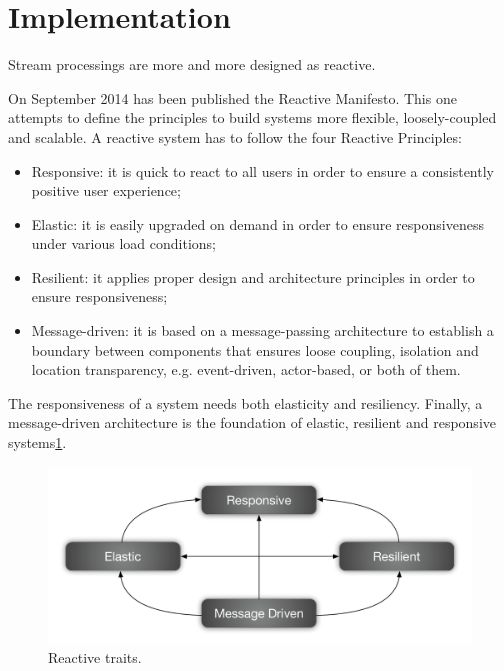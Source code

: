 \section{Implementation}
\label{sec:implementation}


Stream processings are more and more designed as reactive.

On September 2014 has been published the Reactive Manifesto\cite{reactivemanifesto}.
This one attempts to define the principles to build systems more flexible, loosely-coupled and scalable.
A reactive system has to follow the four Reactive Principles:

\begin{itemize}
  \item Responsive: it is quick to react to all users in order to ensure a consistently positive user experience;
  \item Elastic: it is easily upgraded on demand in order to ensure responsiveness under various load conditions;
  \item Resilient: it applies proper design and architecture principles in order to ensure responsiveness;
  \item Message-driven: it is based on a message-passing architecture to establish a boundary between components that ensures loose coupling, isolation and location transparency, e.g. event-driven, actor-based, or both of them.
\end{itemize}

The responsiveness of a system needs both elasticity and resiliency.
Finally, a message-driven architecture is the foundation of elastic, resilient and responsive systems\ref{fig:reactive-traits}.

\begin{figure}[t!]
  \centering
  \includegraphics[width=.99\linewidth]{images/reactive-traits}
  \caption{Reactive traits.}
  \label{fig:reactive-traits}
\end{figure}




